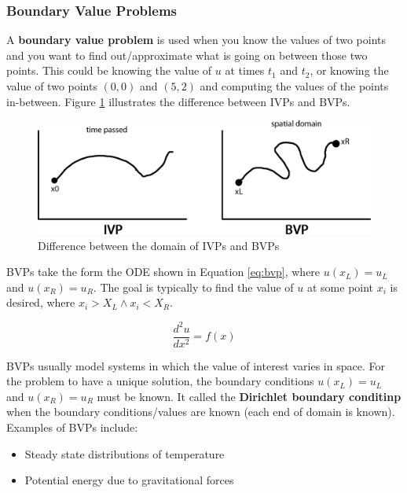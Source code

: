 \documentclass{article}
\begin{document}
\subsubsection{Boundary Value Problems}
\label{sec:bvp}

A \textbf{boundary value problem} is used when you know the values of two points and you want to find out/approximate what is going on between those two points. This could be knowing the value of $u$ at times $t_1$ and $t_2$, or knowing the value of two points $(0, 0)$ and $(5, 2)$ and computing the values of the points in-between. Figure \ref{fig:ivp-bvp-comparison} illustrates the difference between IVPs and BVPs.

\begin{figure}
	\centering
	\includegraphics[scale=0.3]{figures/ivp-bvp-comparison.png}
	\caption{Difference between the domain of IVPs and BVPs}
	\label{fig:ivp-bvp-comparison}
\end{figure}

BVPs take the form the ODE shown in Equation \ref{eq:bvp}, where $u(x_L) = u_L$ and $u(x_R) = u_R$. The goal is typically to find the value of $u$ at some point $x_i$ is desired, where $x_i > X_L \land x_i < X_R$.

\begin{equation}
	\frac{d^2 u}{dx^2} = f(x)
	\label{eq:bvp}
\end{equation}

BVPs usually model systems in which the value of interest varies in space. For the problem to have a unique solution, the boundary conditions $u(x_L) = u_L$ and $u(x_R) = u_R$ must be known. It called the \textbf{Dirichlet boundary conditinp} when the boundary conditions/values are known (each end of domain is known). Examples of BVPs include:
\begin{itemize}
	\item Steady state distributions of temperature
	\item Potential energy due to gravitational forces
\end{itemize}
\end{document}
